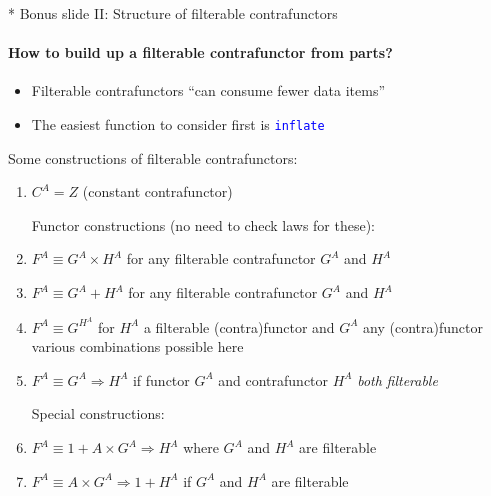\documentclass[english]{beamer}
\begin{document}
\begin{frame}{{*} Bonus slide II: Structure of filterable contrafunctors}

\framesubtitle{How to build up a filterable contrafunctor from parts?}
\begin{itemize}
\item Filterable contrafunctors ``can consume fewer data items''
\item The easiest function to consider first is \texttt{\textcolor{blue}{\footnotesize{}inflate}} 
\end{itemize}
Some constructions of filterable contrafunctors:
\begin{enumerate}
\item $C^{A}=Z$ (constant contrafunctor)

Functor constructions (no need to check laws for these): 
\item $F^{A}\equiv G^{A}\times H^{A}$ for any filterable contrafunctor
$G^{A}$ and $H^{A}$
\item $F^{A}\equiv G^{A}+H^{A}$ for any filterable contrafunctor $G^{A}$
and $H^{A}$
\item $F^{A}\equiv G^{H^{A}}$ for $H^{A}$ a filterable (contra)functor
and $G^{A}$ any (contra)functor \textendash{} various combinations
possible here
\item $F^{A}\equiv G^{A}\Rightarrow H^{A}$ if\emph{ }functor $G^{A}$ and
contrafunctor $H^{A}$ \emph{both} \emph{filterable}

Special constructions:
\item $F^{A}\equiv1+A\times G^{A}\Rightarrow H^{A}$ where $G^{A}$ and
$H^{A}$ are filterable
\item $F^{A}\equiv A\times G^{A}\Rightarrow1+H^{A}$ if $G^{A}$ and $H^{A}$
are filterable
\end{enumerate}
\end{frame}
\end{document}
